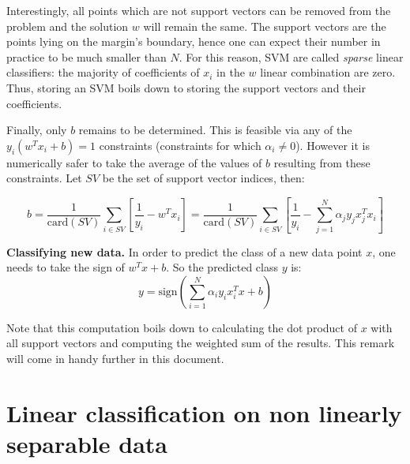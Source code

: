 \documentclass{article}
\begin{document}
Interestingly, all points which are not support vectors can be removed from the problem and the solution $w$ will remain the same. The support vectors are the points lying on the margin's boundary, hence one can expect their number in practice to be much smaller than $N$. For this reason, SVM are called \emph{sparse} linear classifiers: the majority of coefficients of $x_i$ in the $w$ linear combination are zero. Thus, storing an SVM boils down to storing the support vectors and their coefficients.

Finally, only $b$ remains to be determined. This is feasible via any of the $y_i\left( w^Tx_i + b \right) = 1$ constraints (constraints for which $\alpha_i\neq 0$). However it is numerically safer to take the average of the values of $b$ resulting from these constraints. Let $SV$ be the set of support vector indices, then:

\begin{equation*}
b = \frac{1}{\text{card}(SV)} \sum_{i \in SV} \left[ \frac{1}{y_i} - w^T x_i \right] = \frac{1}{\text{card}(SV)} \sum_{i \in SV} \left[ \frac{1}{y_i} - \sum_{j=1}^N \alpha_j y_j x_j^T x_i \right]
\end{equation*}

\textbf{Classifying new data.} In order to predict the class of a new data point $x$, one needs to take the sign of $w^Tx+b$. So the predicted class $y$ is:
\begin{equation*}
y = \text{sign}\left( \sum_{i=1}^N \alpha_i y_i x_i^T x + b \right)
\end{equation*}

Note that this computation boils down to calculating the dot product of $x$ with all support vectors and computing the weighted sum of the results. This remark will come in handy further in this document.

\section*{Linear classification on non linearly separable data}
\end{document}
